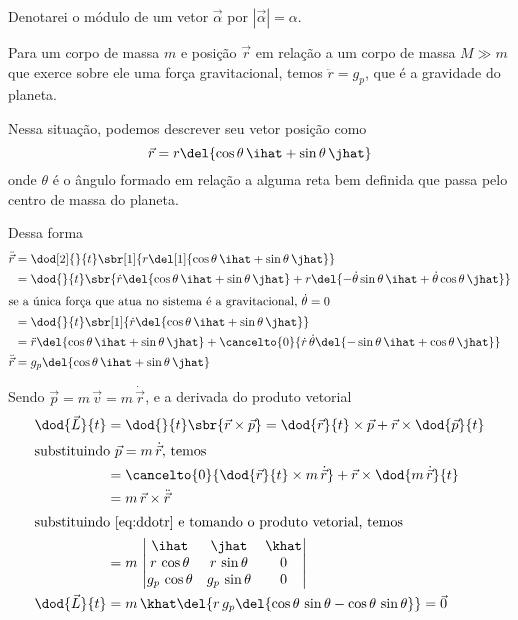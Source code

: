 \documentclass[]{IMTexam}
\begin{document}
\begin{questions}
\begin{parts}
		\begin{solution}
			Denotarei o módulo de um vetor $\vec{\alpha}$ por $ |\vec{\alpha}|=\alpha $.
			
			Para um corpo de massa $ m $ e posição $ \vec{r} $ em relação a um corpo de massa $ M\gg m $ que exerce sobre ele uma força gravitacional, temos $ \ddot{r}=g_p $, que é a gravidade do planeta.
			
			Nessa situação, podemos descrever seu vetor posição como
			\[ \vec{r}=r\del{\cos\theta\,\ihat+\sin\theta\,\jhat} \]
			onde $ \theta $ é o ângulo formado em relação a alguma reta bem definida que passa pelo centro de massa do planeta.
			
			Dessa forma
			\begin{align}
			\ddot{\vec{r}}&=\dod[2]{}{t}\sbr[1]{r\del[1]{\cos\theta\,\ihat+\sin\theta\,\jhat}}\nonumber\\
			&=\dod{}{t}\sbr{\dot{r}\del{\cos\theta\,\ihat+\sin\theta\,\jhat}+r\del{-\dot{\theta}\sin\theta\,\ihat+\dot{\theta}\cos\theta\,\jhat}}\nonumber\\
			\intertext{se a única força que atua no sistema é a gravitacional, $ \dot{\theta}=0 $}
			&=\dod{}{t}\sbr[1]{\dot{r}\del{\cos\theta\,\ihat+\sin\theta\,\jhat}}\nonumber\\
			&=\ddot{r}\del{\cos\theta\,\ihat+\sin\theta\,\jhat}
			+\cancelto{0}{\dot{r}\,\dot{\theta}\del{-\sin\theta\,\ihat+\cos\theta\,\jhat}}\nonumber\\
			\ddot{\vec{r}}&=g_p\del{\cos\theta\,\ihat+\sin\theta\,\jhat}\label{eq:ddotr}
			\end{align}
			
			Sendo $ \vec{p}=m\,\vec{v}=m\,\dot{\vec{r}} $, e a derivada do produto vetorial
			\begin{align*}
			\dod{\vec{L}}{t}&=\dod{}{t}\sbr{\vec{r}\times\vec{p}}=\dod{\vec{r}}{t}\times\vec{p}+\vec{r}\times\dod{\vec{p}}{t}\\
			\intertext{substituindo $ \vec{p}=m\,\dot{\vec{r}} $, temos}
			&=\cancelto{0}{\dod{\vec{r}}{t}\times m\,\dot{\vec{r}}}+\vec{r}\times\dod{m\,\dot{\vec{r}}}{t}\\
			&=m\,\vec{r}\times\ddot{\vec{r}}\\
			\intertext{substituindo \ref{eq:ddotr} e tomando o produto vetorial, temos}
			&=m\,\begin{vmatrix}
			\ihat & \jhat & \khat\\
			r\,\cos\theta & r\,\sin\theta & 0\\
			g_p\,\cos\theta & g_p\,\sin\theta & 0
			\end{vmatrix}\\
			\dod{\vec{L}}{t}&=m\,\khat\del{r\,g_p\del{\cos\theta\,\sin\theta-\cos\theta\,\sin\theta}}=\vec{0}
			\end{align*}
		\end{solution}


\end{parts}
\end{questions}
\end{document}
